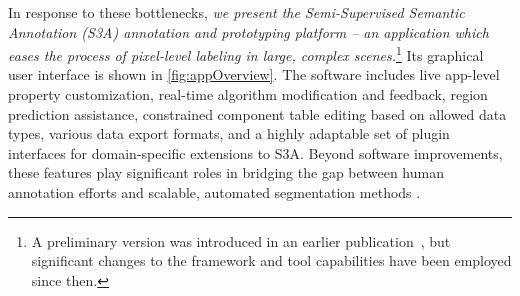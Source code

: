 In response to these bottlenecks, \emph{we present the Semi-Supervised Semantic Annotation (S3A) annotation and prototyping platform -- an application which eases the process of pixel-level labeling in large, complex scenes.}\footnote{A preliminary version was introduced in an earlier publication~\cite{jessurunComponentDetectionEvaluation2020}, but significant changes to the framework and tool capabilities have been employed since then.}
Its graphical user interface is shown in \autoref{fig:appOverview}.
The software includes live app-level property customization, real-time algorithm modification and feedback, region prediction assistance, constrained component table editing based on allowed data types, various data export formats, and a highly adaptable set of plugin interfaces for domain-specific extensions to S3A.
Beyond software improvements, these features play significant roles in bridging the gap between human annotation efforts and scalable, automated segmentation methods \cite{Branson_humansInLoop}.

\makeAppOverviewFig